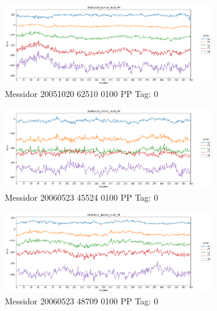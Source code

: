 \begin{figure}[ht!]
	\centering
	\begin{subfigure}[b]{ 0.85\textwidth}
		\centering
		\includegraphics[width=\textwidth]{Figures/chapter_stability/20051020_62510_0100_PP/r/scores.png}
		\caption{Messidor 20051020 62510 0100 PP Tag: 0}
	\end{subfigure} 
	\begin{subfigure}[b]{ 0.85\textwidth}
		\centering
		\includegraphics[width=\textwidth]{Figures/chapter_stability/20060523_45524_0100_PP/r/scores.png}
		\caption{Messidor 20060523 45524 0100 PP Tag: 0}		
	\end{subfigure}	
	\begin{subfigure}[b]{ 0.85\textwidth}
		\centering
		\includegraphics[width=\textwidth]{Figures/chapter_stability/20060523_48709_0100_PP/r/scores.png}
		\caption{Messidor 20060523 48709 0100 PP Tag: 0}		
	\end{subfigure} 
	\begin{subfigure}[b]{ 0.85\textwidth}

\end{subfigure}
\end{figure}
